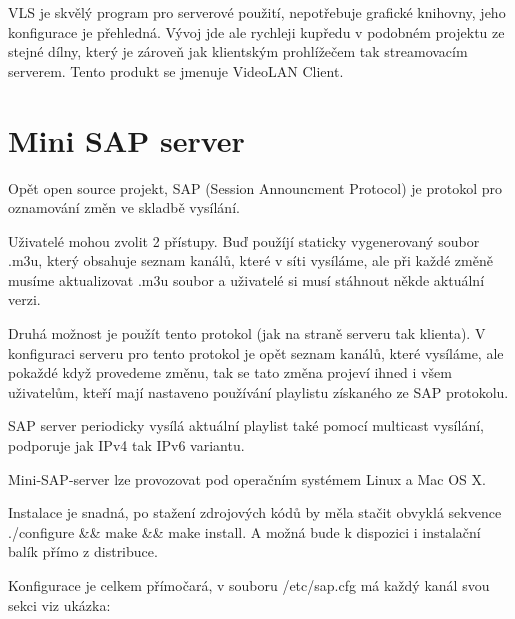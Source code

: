 \vspace{10pt}

VLS je skvělý program pro serverové použití, nepotřebuje grafické knihovny, jeho konfigurace je přehledná. Vývoj jde ale rychleji kupředu v podobném projektu ze stejné dílny, který je zároveň jak klientským prohlížečem tak streamovacím serverem. Tento produkt se jmenuje VideoLAN Client.

\vspace{10pt}

\section{Mini SAP server}

Opět open source projekt, SAP (Session Announcment Protocol) je protokol pro oznamování změn ve skladbě vysílání. 

Uživatelé mohou zvolit 2 přístupy. Buď použíjí staticky vygenerovaný soubor .m3u, který obsahuje seznam kanálů, které v síti vysíláme, ale při každé změně musíme aktualizovat .m3u soubor a uživatelé si musí stáhnout někde aktuální verzi.

Druhá možnost je použít tento protokol (jak na straně serveru tak klienta). V konfiguraci serveru pro tento protokol je opět seznam kanálů, které vysíláme, ale pokaždé když provedeme změnu, tak se tato změna projeví ihned i všem uživatelům, kteří mají nastaveno používání playlistu získaného ze SAP protokolu.

\vspace{10pt}

SAP server periodicky vysílá aktuální playlist také pomocí multicast vysílání, podporuje jak IPv4 tak IPv6 variantu.

\vspace{10pt}

Mini-SAP-server lze provozovat pod operačním systémem Linux a Mac OS X. 

\vspace{10pt}

Instalace je snadná, po stažení zdrojových kódů by měla stačit obvyklá sekvence ./configure \&\& make \&\& make install. A možná bude k dispozici i instalační balík přímo z distribuce.

\vspace{10pt}

Konfigurace je celkem přímočará, v souboru /etc/sap.cfg má každý kanál svou sekci viz ukázka: 

\vspace{10pt}

